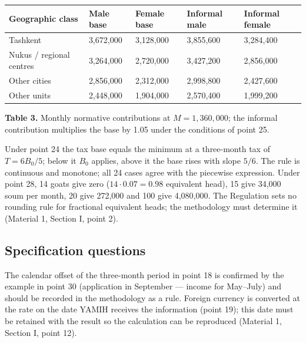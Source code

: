 \documentclass[12pt,a4paper]{extarticle}
\begin{document}
\begingroup\fontsize{11bp}{13.2bp}\selectfont
\begin{longtable}{p{} p{} p{} p{} p{}}
\toprule
Geographic class & Male base & Female base & Informal male & Informal female \\
\midrule
\endhead
Tashkent & 3,672,000 & 3,128,000 & 3,855,600 & 3,284,400 \\
Nukus / regional centres & 3,264,000 & 2,720,000 & 3,427,200 & 2,856,000 \\
Other cities & 2,856,000 & 2,312,000 & 2,998,800 & 2,427,600 \\
Other units & 2,448,000 & 1,904,000 & 2,570,400 & 1,999,200 \\
\bottomrule
\end{longtable}
\endgroup
\textbf{Table 3.} Monthly normative contributions at $M=1{,}360{,}000$; the informal contribution multiplies the base by 1.05 under the conditions of point 25.

Under point 24 the tax base equals the minimum at a three-month tax of $T=6B_0/5$; below it $B_0$ applies, above it the base rises with slope $5/6$. The rule is continuous and monotone; all 24 cases agree with the piecewise expression. Under point 28, 14 goats give zero ($14\cdot0.07=0.98$ equivalent head), 15 give 34,000 soum per month, 20 give 272,000 and 100 give 4,080,000. The Regulation sets no rounding rule for fractional equivalent heads; the methodology must determine it (Material 1, Section I, point 2).

\subsection{Specification questions}
The calendar offset of the three-month period in point 18 is confirmed by the example in point 30 (application in September — income for May–July) and should be recorded in the methodology as a rule. Foreign currency is converted at the rate on the date YAMIH receives the information (point 19); this date must be retained with the result so the calculation can be reproduced (Material 1, Section I, point 12).
\end{document}
